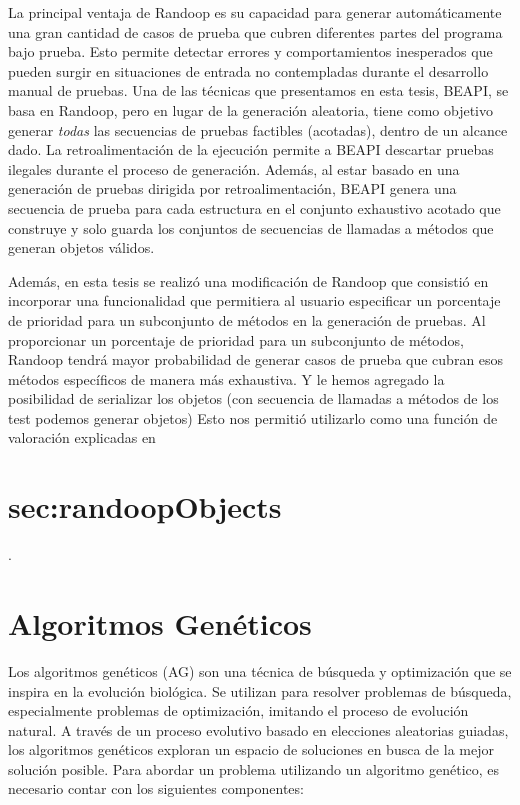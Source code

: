 La principal ventaja de \textsf{Randoop} es su capacidad para generar automáticamente una gran cantidad de casos de prueba que cubren diferentes partes del programa bajo prueba. Esto permite detectar errores y comportamientos inesperados que pueden surgir en situaciones de entrada no contempladas durante el desarrollo manual de pruebas.
Una de las técnicas que presentamos en esta tesis, \textsf{BEAPI}, se basa en \textsf{Randoop}, pero en lugar de la generación aleatoria, tiene como objetivo generar \emph{todas} las secuencias de pruebas factibles (acotadas), dentro de un alcance dado. La retroalimentación de la ejecución permite a \textsf{BEAPI} descartar pruebas ilegales durante el proceso de generación. Además, al estar basado en una generación de pruebas dirigida por retroalimentación, \textsf{BEAPI} genera una secuencia de prueba para cada estructura en el conjunto exhaustivo acotado que construye y solo guarda los conjuntos de secuencias de llamadas a métodos que generan objetos válidos.


Además, en esta tesis se realizó una modificación de Randoop que consistió en incorporar una funcionalidad que permitiera al usuario especificar un porcentaje de prioridad para un subconjunto de métodos en la generación de pruebas. Al proporcionar un porcentaje de prioridad para un subconjunto de métodos, Randoop tendrá mayor probabilidad de generar casos de prueba que cubran esos métodos específicos de manera más exhaustiva. Y le hemos agregado la posibilidad de serializar los objetos (con secuencia de llamadas a métodos de los test podemos generar objetos) Esto nos permitió utilizarlo como una función de valoración explicadas en \section{sec:randoopObjects}.


\section{Algoritmos Genéticos}
\label{sec:geneticoPrev}
Los algoritmos genéticos (AG) \cite{goldberg1989genetic} son una técnica de búsqueda y optimización que se inspira en la evolución biológica. Se utilizan para resolver problemas de búsqueda, especialmente problemas de optimización, imitando el proceso de evolución natural. A través de un proceso evolutivo basado en elecciones aleatorias guiadas, los algoritmos genéticos exploran un espacio de soluciones en busca de la mejor solución posible.
Para abordar un problema utilizando un algoritmo genético, es necesario contar con los siguientes componentes:

